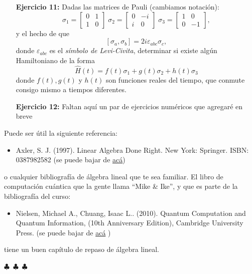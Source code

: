 \documentclass[a4paper,12pt]{article}
\begin{document}
\begin{enumerate}
    \item[\bf Ejercicio 11:] Dadas las matrices de Pauli (cambiamos notación):
    \begin{equation}
        \sigma_1 = \begin{bmatrix}
            0 & 1 \\
            1 & 0 
            \end{bmatrix}\;
        \sigma_2 = \begin{bmatrix}
            0 & -i \\
            i & 0 
            \end{bmatrix}\;
        \sigma_3 = \begin{bmatrix}
            1 & 0 \\
            0 & -1 
            \end{bmatrix},
    \end{equation} 
    y el hecho de que 
    \[\left[\sigma_{a}, \sigma_{b}\right]=2 i \varepsilon_{a b c} \sigma_{c},\]
    donde $\varepsilon_{a b c}$ es el {\em símbolo de Levi-Civita}, determinar si existe algún Hamiltoniano de la forma
    \[\hat{H}(t)=f(t)\sigma_1+g(t)\sigma_2+h(t)\sigma_3\]
    donde $f(t),g(t)$ y $h(t)$ son funciones reales del tiempo, que conmute consigo mismo a tiempos diferentes. 
    
    \item[\bf Ejercicio 12:]Faltan aquí un par de ejercicios numéricos que agregaré en breve

\end{enumerate}

\noindent Puede ser útil la siguiente referencia:
 \begin{itemize}
     \item Axler, S. J. (1997). Linear Algebra Done Right. New York: Springer. ISBN: 0387982582 (se puede bajar de \href{https://drive.google.com/file/d/1_qZOW2kRbgqRhuUlvlGcM7RA3KjVcvuB/view?usp=sharing}{acá})
 \end{itemize}
o cualquier bibliografía de álgebra lineal que te sea familiar. El libro de computación cuántica que la gente llama ``Mike \& Ike'', y que es parte de la bibliografía del curso:
\begin{itemize}
    \item Nielsen, Michael A., Chuang, Isaac L.. (2010). Quantum Computation and Quantum Information, (10th Anniversary Edition), Cambridge University Press. (se puede bajar de \href{https://drive.google.com/file/d/1qk7L6Roq1WlGWSahW66ZX-rwl_wjTxcL/view?usp=sharing}{acá} )
\end{itemize}
tiene un buen capítulo de repaso de álgebra lineal.

\begin{center}
    $\clubsuit$~$\clubsuit$~$\clubsuit$
  \end{center}
\end{document}
